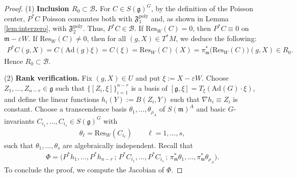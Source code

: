 \documentclass[11pt]{amsart}
\theoremstyle{definition}
\theoremstyle{plain}
\theoremstyle{conclusion}
\begin{document}
 \begin{proof}
    (1) \textbf{Inclusion $R_0\subset \mathcal{B}$.}   For $C\in S(\mathfrak{g})^G$, by the definition of the Poisson center, $P^*C$ Poisson commutes both with $\mathfrak{F}_1^{\mathrm{poly}}$ and, as shown in Lemma \ref{lem:interzero}, with $\mathfrak{F}_2^{\mathrm{poly}}$. Thus, $P^*C\in \mathcal{B}$. If $\mathrm{Res}_W(C)=0$, then $P^*C\equiv 0$ on $\mathfrak{m}-\varepsilon W$. If $\mathrm{Res}_W(C)\neq0$, then for all $(g,X) \in T^*M$, we deduce the following: \begin{align*}
        P^*C(g,X)=C(\mathrm{Ad}(g)\xi)=C(\xi)=\mathrm{Res}_W(C)(X)=\pi_{\mathfrak{m}}^*\big(\mathrm{Res}_W(C)\big)(g,X)\in R_0.
    \end{align*} Hence $R_0\subset \mathcal{B}$.

 (2) \textbf{Rank verification.}
Fix $(g,X)\in U$ and put $\xi:=X-\varepsilon W$. Choose $Z_1,\ldots,Z_{n-r}\in\mathfrak{g}$ such that $\{[Z_i,\xi]\}_{i=1}^{n-r}$ is a basis of $[\mathfrak{g},\xi]=T_\xi(\mathrm{Ad}(G)\cdot\xi)$, and define the linear functions $h_i(Y):=B(Z_i,Y)$ such that $\nabla h_i\equiv Z_i$ is constant. Choose a transcendence basis $\theta_1,\ldots,\theta_{\rho_A}$ of $S(\mathfrak{m})^A$ and basic $G$-invariants $C_{i_1},\ldots,C_{i_s}\in S(\mathfrak{g})^G$ with \begin{align*}
\theta_\ell=\mathrm{Res}_W(C_{i_\ell})\qquad \ell=1,\ldots,s ,
\end{align*} such that $ \theta_1,\ldots,\theta_s $ are algebraically independent. Recall that \begin{align}
\Phi=\bigl(P^*h_1,\ldots,P^*h_{n-r}\,;\, P^*C_{i_1},\ldots,P^*C_{i_s}\,;\, \pi_{\mathfrak{m}}^*\theta_1,\ldots,\pi_{\mathfrak{m}}^*\theta_{\rho_A}\bigr). \label{eq:global}
\end{align} To conclude the proof, we compute the Jacobian of $\Phi$.
 


\end{proof}
\end{document}
